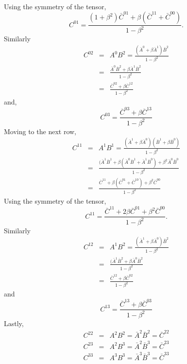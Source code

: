 \begin{enumerate}
\begin{eqnarray*}
\end{eqnarray*}
Using the symmetry of the tensor,
\begin{equation}\label{c1e89}
C^{01} = \frac{(1 + \beta^2)\bar{C}^{01} + \beta(\bar{C}^{11} + \bar{C}^{00})}{1 - \beta^2}.
\end{equation}
Similarly
\begin{eqnarray}
C^{02} &=& A^0 B^2 = \frac{(\bar{A}^0 + \beta\bar{A}^1)\bar{B}^2}{1 - \beta^2} \nonumber \\
 &=& \frac{\bar{A}^0\bar{B}^2 + \beta\bar{A}^1\bar{B}^2}{1 - \beta^2} \nonumber \\
 &=& \frac{\bar{C}^{02} + \beta\bar{C}^{12}}{1 - \beta^2} \label{c1e90}
\end{eqnarray}
and,
\begin{equation}\label{c1e91}
C^{03} = \frac{\bar{C}^{03} + \beta\bar{C}^{13}}{1 - \beta^2}
\end{equation}
Moving to the next row,
\begin{eqnarray*}
C^{11} &=& A^1 B^1 = \frac{(\bar{A}^1 + \beta\bar{A}^0)(\bar{B}^1 + \beta\bar{B}^0)}{1 - \beta^2} \\
 &=& \frac{(\bar{A}^1\bar{B}^1 + \beta(\bar{A}^0\bar{B}^1 + \bar{A}^1\bar{B}^0) + \beta^2\bar{A}^0\bar{B}^0}{1 - \beta^2} \\
 &=& \frac{\bar{C}^{11} + \beta(\bar{C}^{01} + \bar{C}^{10}) + \beta^2\bar{C}^{00}}{1 - \beta^2}
\end{eqnarray*}
Using the symmetry of the tensor,
\begin{equation}\label{c1e92}
C^{11} = \frac{\bar{C}^{11} + 2\beta\bar{C}^{01} + \beta^2\bar{C}^{00}}{1 - \beta^2}.
\end{equation}
Similarly
\begin{eqnarray}
C^{12} &=& A^1 B^2 = \frac{(\bar{A}^1 + \beta\bar{A}^0)\bar{B}^2}{1 - \beta^2} \nonumber \\
 &=& \frac{(\bar{A}^1\bar{B}^2 + \beta\bar{A}^0\bar{B}^2}{1 - \beta^2} \nonumber \\
 &=& \frac{\bar{C}^{12} + \beta\bar{C}^{02}}{1 - \beta^2} \label{c1e93}
\end{eqnarray}
and
\begin{equation}\label{c1e94}
C^{13} = \frac{\bar{C}^{13} + \beta\bar{C}^{03}}{1 - \beta^2} 
\end{equation}
Lastly, 
\begin{eqnarray}
C^{22} &=& A^2B^2 = \bar{A}^2\bar{B}^2 = \bar{C}^{22} \label{c1e95} \\
C^{23} &=& A^2B^3 = \bar{A}^2\bar{B}^3 = \bar{C}^{23} \label{c1e96} \\
C^{33} &=& A^3B^3 = \bar{A}^3\bar{B}^3 = \bar{C}^{33} \label{c1e97}
\end{eqnarray}


\end{enumerate}
